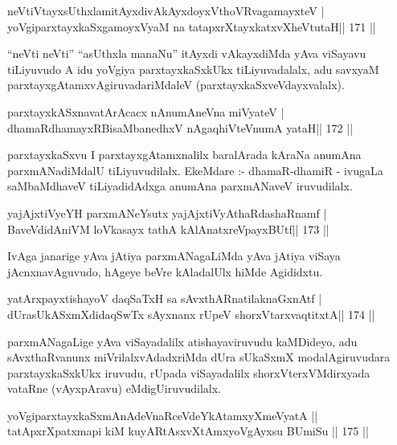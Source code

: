 \begin{shl}
neVtiVtayxsUthxlamitAyxdivAkAyxdoyxV\s thoVR\s vagamayxteV |
yoVgiparxtayxkaSxgamoyxV\s yaM na tatapxrXtayxkatxvXheVtutaH\hfill || 171 ||
\end{shl}

\begin{artha}
``neVti neVti'' ``asUthxla manaNu'' itAyxdi vAkayxdiMda yAva viSayavu tiLiyuvudo A idu yoVgiya parxtayxkaSxkUkx tiLiyuvadalalx, adu savxyaM parxtayxgAtamxvAgiruvadariMdaleV (parxtayxkaSxveVdayxvalalx).
\end{artha}

\begin{shl}
parxtayxkASxnavatArAcacx nAnumAneVna miVyateV |
dhamaRdhamayxRBisaMbanedhxV nAgaqhiVteV\s numA yataH\hfill || 172 ||
\end{shl}

\begin{artha}
parxtayxkaSxvu I parxtayxgAtamxnalilx baralArada kAraNa anumAna parxmANadiMdalU tiLiyuvudilalx. EkeMdare :- dhamaR-dhamiR - ivugaLa saMbaMdhaveV tiLiyadidAdxga anumAna parxmANaveV iruvudilalx.
\end{artha}

\begin{shl}
yajAjxtiVyeYH parxmANeYsutx yajAjxtiVyAthaRdashaRnamf |
BaveVdidAniVM loVkasayx tathA kAlAnatxreV\s payxBUtf\hfill || 173 ||
\end{shl}

\begin{artha}
IvAga janarige yAva jAtiya parxmANagaLiMda yAva jAtiya viSaya jAcnxnavAguvudo, hAgeye beVre kAladalUlx hiMde Agididxtu.
\end{artha}

\begin{shl}
yatArxpayxtishayoV daqSaTxH sa sAvxthARnatilaknaGxnAtf |
dUrasUkASxmXdidaqSwTx sAyxnanx rUpeV shorxVtarxvaqtitxtA\hfill || 174 ||
\end{shl}

\begin{artha}
parxmANagaLige yAva viSayadalilx atishayaviruvudu kaMDideyo, adu sAvxthaRvanunx miVrilalxvAdadxriMda dUra sUkaSxmX modalAgiruvudara parxtayxkaSxkUkx iruvudu, rUpada viSayadalilx shorxVterxVMdirxyada vataRne (vAyxpAravu) eMdigU\break iruvudilalx.
\end{artha}

\begin{shl}
yoVgiparxtayxkaSxmAnAdeVnaRceVdeYkAtamxyXmeVyatA ||
tatApxrXpatxmapi kiM kuyARtAsxvXtAmxyoVgAyxsu BUmiSu \hfill || 175 ||
\end{shl}

